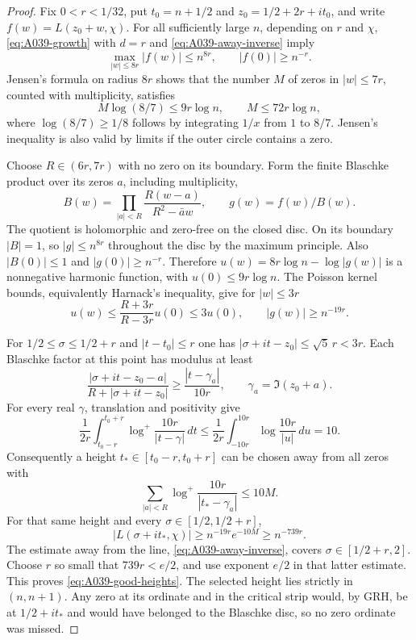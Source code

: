 \begin{proof}
Fix $0<r<1/32$, put $t_0=n+1/2$ and
$z_0=1/2+2r+it_0$, and write $f(w)=L(z_0+w,\chi)$.
For all sufficiently large $n$, depending on $r$ and $\chi$,
\eqref{eq:A039-growth} with $d=r$ and
\eqref{eq:A039-away-inverse} imply
\[
 \max_{|w|\le8r}|f(w)|\le n^{8r},\qquad
                         |f(0)|\ge n^{-r}.
\]
Jensen's formula on radius $8r$ shows that the number $M$ of
zeros in $|w|\le7r$, counted with multiplicity, satisfies
\[
 M\log(8/7)\le9r\log n,
                \qquad M\le72r\log n,
\]
where $\log(8/7)\ge1/8$ follows by integrating $1/x$ from $1$
to $8/7$. Jensen's inequality is also valid by limits if the
outer circle contains a zero.

Choose $R\in(6r,7r)$ with no zero on its boundary. Form the
finite Blaschke product over its zeros $a$, including multiplicity,
\[
 B(w)=\prod_{|a|<R}\frac{R(w-a)}{R^2-\bar a w},
                    \qquad g(w)=f(w)/B(w).
\]
The quotient is holomorphic and zero-free on the closed disc.
On its boundary $|B|=1$, so $|g|\le n^{8r}$ throughout the
disc by the maximum principle. Also $|B(0)|\le1$ and
$|g(0)|\ge n^{-r}$. Therefore
$u(w)=8r\log n-\log|g(w)|$ is a nonnegative harmonic function,
with $u(0)\le9r\log n$. The Poisson kernel bounds, equivalently
Harnack's inequality, give for $|w|\le3r$
\[
 u(w)\le\frac{R+3r}{R-3r}u(0)\le3u(0),
                  \qquad |g(w)|\ge n^{-19r}.
\]

For $1/2\le\sigma\le1/2+r$ and $|t-t_0|\le r$ one has
$|\sigma+it-z_0|\le\sqrt5\,r<3r$. Each Blaschke factor at
this point has modulus at least
\[
 \frac{|\sigma+it-z_0-a|}{R+|\sigma+it-z_0|}
                         \ge\frac{|t-\gamma_a|}{10r},
 \qquad\gamma_a=\Im(z_0+a).
\]
For every real $\gamma$, translation and positivity give
\[
 \frac1{2r}\int_{t_0-r}^{t_0+r}
       \log^+\frac{10r}{|t-\gamma|}\,dt
 \le\frac1{2r}\int_{-10r}^{10r}
       \log\frac{10r}{|u|}\,du=10.
\]
Consequently a height $t_*\in[t_0-r,t_0+r]$ can be chosen
away from all zeros with
\[
             \sum_{|a|<R}\log^+\frac{10r}{|t_*-\gamma_a|}
                            \le10M.
\]
For that same height and every $\sigma\in[1/2,1/2+r]$,
\[
 |L(\sigma+it_*,\chi)|
            \ge n^{-19r}e^{-10M}\ge n^{-739r}.
\]
The estimate away from the line, \eqref{eq:A039-away-inverse},
covers $\sigma\in[1/2+r,2]$. Choose $r$ so small that
$739r<e/2$, and use exponent $e/2$ in that latter estimate.
This proves \eqref{eq:A039-good-heights}. The selected height
lies strictly in $(n,n+1)$. Any zero at its ordinate and in the
critical strip would, by GRH, be at $1/2+it_*$ and would have
belonged to the Blaschke disc, so no zero ordinate was missed.


\end{proof}
